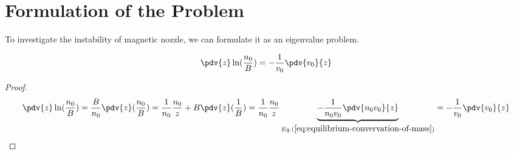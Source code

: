 \chapter{Formulation of the Problem}
To investigate the instability of magnetic nozzle, we can formulate it as an eigenvalue problem.
\begin{proposition}
	\begin{equation}
		\pdv{z}\ln(\frac{n_0}{B}) = -\frac{1}{v_0}\pdv{v_0}{z}
		\label{eq:dv-ln}
	\end{equation}
\end{proposition}
\begin{proof}
	\[ \pdv{z}\ln(\frac{n_0}{B}) 
	= \frac{B}{n_0}\pdv{z}(\frac{n_0}{B})
	= \frac{1}{n_0}\frac{n_0}{z} + B\pdv{z}(\frac{1}{B})
	=
	\frac{1}{n_0}\frac{n_0}{z} \underbrace{- \frac{1}{n_0v_0}\pdv{n_0v_0}{z}}_{Eq.(\ref{eq:equilibrium-convervation-of-mass})}
	= -\frac{1}{v_0}\pdv{v_0}{z} \]
\end{proof}

